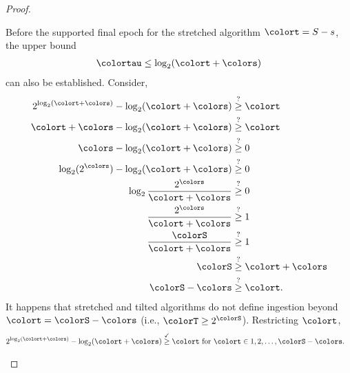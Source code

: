 \begin{proof}
\begin{proofpart}
Before the supported final epoch for the stretched algorithm $\colort = S - s$, the upper bound
\begin{align}
\colortau \leq \log_2(\colort + \colors) \label{eqn:meta-epoch-bound-large}
\end{align}
can also be established.
Consider,
\begin{align*}
2^{\log_{2}(\colort + \colors)} - \log_2(\colort + \colors)
&\stackrel{?}{\geq} \colort\\
\colort + \colors - \log_2(\colort + \colors)
&\stackrel{?}{\geq} \colort\\
\colors - \log_2(\colort + \colors)
&\stackrel{?}{\geq} 0\\
\log_2(2^{\colors}) - \log_2(\colort + \colors)
&\stackrel{?}{\geq} 0\\
\log_2\frac{2^{\colors}}{\colort + \colors}
&\stackrel{?}{\geq} 0\\
\frac{2^{\colors}}{\colort + \colors}
&\stackrel{?}{\geq} 1\\
\frac{\colorS}{\colort + \colors}
&\stackrel{?}{\geq} 1\\
\colorS
&\stackrel{?}{\geq} \colort + \colors\\
\colorS - \colors &\stackrel{?}{\geq} \colort.
\end{align*}
It happens that stretched and tilted algorithms do not define ingestion beyond $\colort = \colorS - \colors$ (i.e., $\colorT \geq 2^{\colorS}$).
Restricting $\colort$,
\begin{align*}
2^{\log_{2}(\colort + \colors)} - \log_2(\colort + \colors)
&\stackrel{\checkmark}{\geq} \colort \text{ for } \colort \in 1, 2, \ldots, \colorS - \colors.
\end{align*}
\end{proofpart}
\end{proof}
